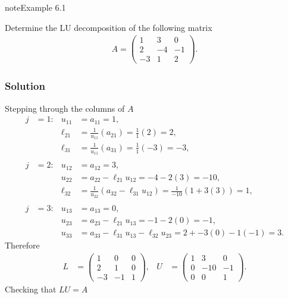 \documentclass[letterpaper,10pt,english]{jupyterBook}
\begin{document}
\begin{sphinxadmonition}{note}{Example 6.1}

\sphinxAtStartPar
Determine the LU decomposition of the following matrix
\begin{align*}
    A=\begin{pmatrix}
        1 & 3 & 0\\
        2 & -4 & -1\\
        -3 & 1 & 2
    \end{pmatrix}.
\end{align*}\subsubsection*{Solution}

\sphinxAtStartPar
Stepping through the columns of \(A\)
\begin{align*}
    j&=1: & u_{11} &=a_{11} =1,\\
    && \ell_{21} &=\frac{1}{u_{11} }(a_{21} )=\frac{1}{1}(2)=2,\\
    && \ell_{31} &=\frac{1}{u_{11} }(a_{31} )=\frac{1}{1}(-3)=-3,\\
    \\
    j&=2: & u_{12} &=a_{12} =3,\\
    && u_{22} &=a_{22} -\ell_{21} u_{12} =-4-2(3)=-10,\\
    && \ell_{32} &=\frac{1}{u_{22} }(a_{32} -\ell_{31} u_{12} ) = \frac{1}{-10}(1+3(3))=1,\\
    \\
    j&=3: & u_{13} &=a_{13} =0,\\
    && u_{23} &=a_{23} -\ell_{21} u_{13} =-1-2(0)=-1,\\
    && u_{33} &=a_{33} -\ell_{31} u_{13} -\ell_{32} u_{23} =2+-3(0)-1(-1)=3.
\end{align*}
\sphinxAtStartPar
Therefore
\begin{align*}
    L &= \begin{pmatrix}
        1 & 0 & 0\\
        2 & 1 & 0\\
        -3 & -1 & 1
    \end{pmatrix},&
    U &= \begin{pmatrix}
        1 & 3 & 0 \\
        0 & -10 & -1 \\
        0 & 0 & 1
    \end{pmatrix}.
\end{align*}
\sphinxAtStartPar
Checking that \(LU=A\)

\end{sphinxadmonition}
\end{document}
